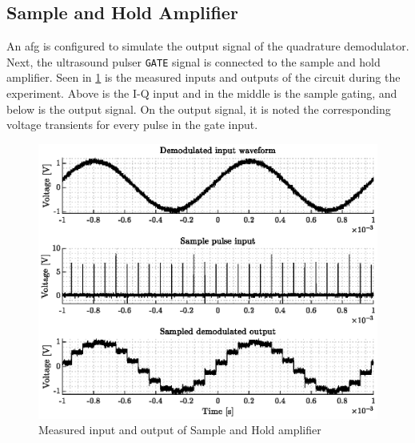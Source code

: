 \subsection{Sample and Hold Amplifier}
An \gls{afg} is configured to simulate the output signal of the quadrature demodulator. Next, the ultrasound pulser \texttt{GATE} signal is connected to the sample and hold amplifier. Seen in \cref{fig:4_sample_hold_pcb} is the measured inputs and outputs of the circuit during the experiment. Above is the I-Q input and in the middle is the sample gating, and below is the output signal. On the output signal, it is noted the corresponding voltage transients for every pulse in the gate input.
\begin{figure}[htbp]
	\centering
	\includegraphics[width=.8\textwidth]{Figures/4_sampler_pcb.eps}
	\caption{Measured input and output of Sample and Hold amplifier}
	\label{fig:4_sample_hold_pcb}
\end{figure}

